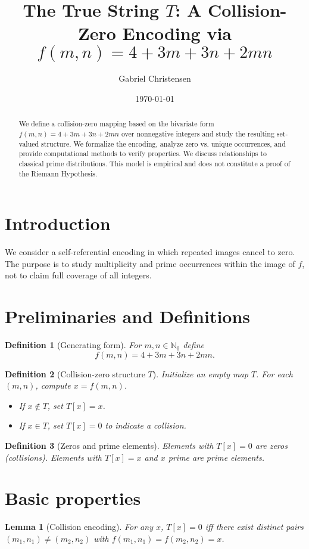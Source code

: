 \documentclass[12pt,a4paper]{article}
\title{The True String \(T\): A Collision-Zero Encoding via \(f(m,n)=4+3m+3n+2mn\)}
\author{Gabriel Christensen}
\date{\today}
\newtheorem{definition}{Definition}[section]
\newtheorem{lemma}{Lemma}[section]
\begin{document}
\maketitle
\begin{abstract}
We define a collision-zero mapping based on the bivariate form \(f(m,n)=4+3m+3n+2mn\) over nonnegative integers and study the resulting set-valued structure. We formalize the encoding, analyze zero vs. unique occurrences, and provide computational methods to verify properties. We discuss relationships to classical prime distributions. This model is empirical and does not constitute a proof of the Riemann Hypothesis.
\end{abstract}

\tableofcontents
\newpage

\section{Introduction}
We consider a self-referential encoding in which repeated images cancel to zero. The purpose is to study multiplicity and prime occurrences within the image of \(f\), not to claim full coverage of all integers.

\section{Preliminaries and Definitions}
\begin{definition}[Generating form]\label{def:f}
For \(m,n\in\mathbb{N}_0\) define
\[
 f(m,n) = 4 + 3m + 3n + 2mn.
\]
\end{definition}

\begin{definition}[Collision-zero structure \(T\)]\label{def:T}
Initialize an empty map \(T\). For each \((m,n)\), compute \(x = f(m,n)\).
\begin{itemize}
    \item If \(x\notin T\), set \(T[x]=x\).
    \item If \(x\in T\), set \(T[x]=0\) to indicate a collision.
\end{itemize}
\end{definition}

\begin{definition}[Zeros and prime elements]
Elements with \(T[x]=0\) are \emph{zeros} (collisions). Elements with \(T[x]=x\) and \(x\) prime are \emph{prime elements}.
\end{definition}

\section{Basic properties}
\begin{lemma}[Collision encoding]\label{lem:collision}
For any \(x\), \(T[x]=0\) iff there exist distinct pairs \((m_1,n_1)\ne(m_2,n_2)\) with \(f(m_1,n_1)=f(m_2,n_2)=x\).
\end{lemma}
\end{document}
